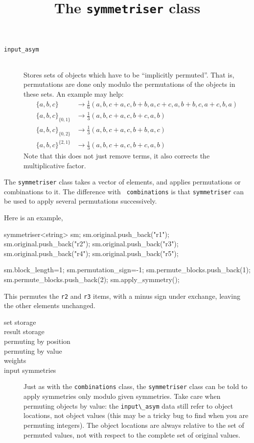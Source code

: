 \documentclass[11pt]{kasper}
\begin{document}
\begin{sectionunit}
\begin{sectionunit}
\begin{description}
\item[{\tt input\_asym}] ~\\
Stores sets of objects which have to be ``implicitly
permuted''. That is, permutations are done only modulo the
permutations of the objects in these sets. An example may help:
\begin{equation}
\begin{aligned}
\{a,b,c\}           &\rightarrow \frac{1}{6}(a,b,c + a,c,b + b,a,c + c,a,b + b,c,a + c,b,a)\\
\{a,b,c\}_{\{0,1\}} &\rightarrow \frac{1}{3}(a,b,c + a,c,b + c,a,b)\\
\{a,b,c\}_{\{0,2\}} &\rightarrow \frac{1}{3}(a,b,c + a,c,b + b,a,c)\\
\{a,b,c\}^{\{2,1\}} &\rightarrow \frac{1}{3}(a,b,c + a,c,b + c,a,b)
\end{aligned}
\end{equation}
Note that this does not just remove terms, it also corrects the
multiplicative factor.
\end{description}
\end{sectionunit}
\begin{sectionunit}
\title{The {\tt symmetriser} class}
\maketitle
The {\tt symmetriser} class takes a vector of elements, and applies
permutations or combinations to it. The difference with {\tt
  combinations} is that {\tt symmetriser} can be used to apply several
permutations successively. 

Here is an example,
\begin{screen}
symmetriser<string> sm;
sm.original.push_back("r1");
sm.original.push_back("r2");
sm.original.push_back("r3");
sm.original.push_back("r4");
sm.original.push_back("r5");

sm.block_length=1;
sm.permutation_sign=-1;
sm.permute_blocks.push_back(1);
sm.permute_blocks.push_back(2);
sm.apply_symmetry();
\end{screen}
This permutes the {\tt r2} and {\tt r3} items, with a minus sign under
exchange, leaving the other elements unchanged. 

\begin{description}
\item[set storage]
\item[result storage]
\item[permuting by position]
\item[permuting by value]
\item[weights]
\item[input symmetries] Just as with the {\tt combinations} class,
the {\tt symmetriser} class can be told to apply symmetries only 
modulo given symmetries. Take care when permuting objects by value:
the \verb|input\_asym| data still refer to object locations, not
object values (this may be a tricky bug to find when you are permuting
integers). The object locations are always relative to the set of 
permuted values, not with respect to the complete set of original values.
\end{description}



\end{sectionunit}
\end{sectionunit}
\end{document}
